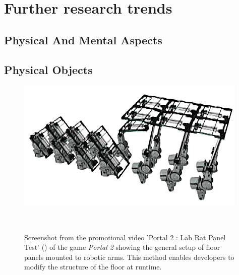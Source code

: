 \section{Further research trends}
\subsection{Physical And Mental Aspects}

\subsection{Physical Objects}

\begin{figure}
	\centering
	\includegraphics[width=0.9\columnwidth]{./figures/portallabrattest}
	\caption[Portal 2 : Lab Rat Panel Test]{Screenshot from the promotional video 'Portal 2 : Lab Rat Panel Test' (\ccbyncsa) of the game \textit{Portal 2 \textregistered\textcopyright} showing the general setup of floor panels mounted to robotic arms. This method enables developers to modify the structure of the floor at runtime.\footnotemark}~\label{fig:portallabrattest}
\end{figure}

